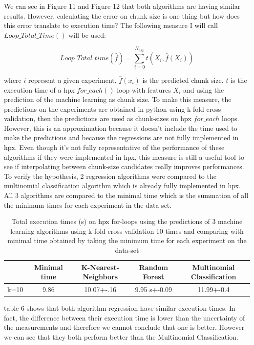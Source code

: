 We can see in Figure 11 and Figure 12 that both algorithms are having similar results. However, calculating the error on chunk size is one thing but how does this error translate to execution time? The following measure I will call $Loop\_Total\_Time()$ will be used:

$$Loop\_Total\_time(\hat{f})=\sum_{i=0}^{N_{exp}} t(X_i,\hat{f}(X_i))$$

where $i$ represent a given experiment, $\hat{f}(x_i)$ is the predicted chunk size. $t$ is the execution time of a hpx $for\_each()$ loop with features $X_i$ and using the prediction of the machine learning as chunk size. To make this measure, the predictions on the experiments are obtained in python using k-fold cross validation, then the predictions are used as chunk-sizes on hpx $for\_each$ loops. However, this is an approximation because it doesn't include the time used to make the predictions and because the regressions are not fully implemented in hpx. Even though it's not fully representative of the performance of these algorithms if they were implemented in hpx, this measure is still a useful tool to see if interpolating between chunk-size candidates really improves performances. To verify the hypothesis, 2 regression algorithms were compared to the multinomial classification algorithm which is already fully implemented in hpx. All 3 algorithms are compared to the minimal time which is the summation of all the minimum times for each experiment in the data set.

\begin{table}[h]
	\centering
	\caption{Total execution times (s) on hpx for-loops using the predictions of 3 machine learning algorithms using k-fold cross validation 10 times and comparing with minimal time obtained by taking the minimum time for each experiment on the data-set}
	\label{my-label}
	\begin{tabular}{|c|c|c|c|c|}
		\hline
		& Minimal time &K-Nearest-Neighbors & Random Forest &Multinomial Classification\\ \hline
		k=10 & 9.86
		&10.07+-.16  & 9.95 s+-0.09 & 11.99+-0.4\\ \hline
	\end{tabular}
\end{table}

table 6 shows that both algorithm regression have similar execution times. In fact, the difference between their execution time is lower than the uncertainty of the measurements and therefore we cannot conclude that one is better. However we can see that they both perform better than the Multinomial Classification. 

